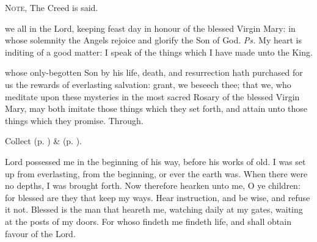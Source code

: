 \begin{rubric}
	\textsc{Note,} The Creed is said.
\end{rubric}

\introit
{} we all in the Lord, keeping feast day in honour of the blessed Virgin Mary: in whose solemnity the Angels rejoice and glorify the Son of God. \textit{Ps.} My heart is inditing of a good matter: I speak of the things which I have made unto the King.

\collect
{} whose only-begotten Son by his life, death, and resurrection hath purchased for us the rewards of everlasting salvation: grant, we beseech thee; that we, who meditate upon these mysteries in the most sacred Rosary of the blessed Virgin Mary, may both imitate those things which they set forth, and attain unto those things which they promise. Through.

\begin{rubric}
	 Collect  (p. \pageref{MarkRomeCollect}) \&   (p. \pageref{SergiusCollect}).
\end{rubric}

 Lord possessed me in the beginning of his way, before his works of old. I was set up from everlasting, from the beginning, or ever the earth was. When there were no depths, I was brought forth. Now therefore hearken unto me, O ye children: for blessed are they that keep my ways. Hear instruction, and be wise, and refuse it not. Blessed is the man that heareth me, watching daily at my gates, waiting at the posts of my doors. For whoso findeth me findeth life, and shall obtain favour of the Lord.


